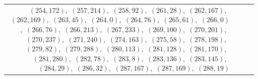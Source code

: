 \documentclass[11pt]{article}
\begin{document}
\begin{longtable}{@{}rrl>{\raggedright\arraybackslash}p{}@{}}
$(254,172)$,\allowbreak\ $(257,214)$,\allowbreak\ $(258,92)$,\allowbreak\ $(261,28)$,\allowbreak\ $(262,167)$,\allowbreak\ $(262,169)$,\allowbreak\ $(263,45)$,\allowbreak\ $(264,0)$,\allowbreak\ $(264,76)$,\allowbreak\ $(265,61)$,\allowbreak\ $(266,0)$,\allowbreak\ $(266,76)$,\allowbreak\ $(266,213)$,\allowbreak\ $(267,233)$,\allowbreak\ $(269,100)$,\allowbreak\ $(270,201)$,\allowbreak\ $(270,237)$,\allowbreak\ $(271,240)$,\allowbreak\ $(274,163)$,\allowbreak\ $(275,58)$,\allowbreak\ $(278,198)$,\allowbreak\ $(279,82)$,\allowbreak\ $(279,288)$,\allowbreak\ $(280,113)$,\allowbreak\ $(281,128)$,\allowbreak\ $(281,170)$,\allowbreak\ $(281,280)$,\allowbreak\ $(282,78)$,\allowbreak\ $(283,8)$,\allowbreak\ $(283,136)$,\allowbreak\ $(283,145)$,\allowbreak\ $(284,29)$,\allowbreak\ $(286,32)$,\allowbreak\ $(287,167)$,\allowbreak\ $(287,169)$,\allowbreak\ $(288,19)$\\

\end{longtable}
\end{document}
